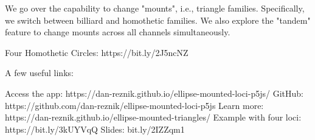 We go over the capability to change "mounts", i.e., triangle families. Specifically, we switch between billiard and homothetic families. We also explore the "tandem" feature to change mounts across all channels simultaneously.

Four Homothetic Circles: https://bit.ly/2J5ncNZ

A few useful links:

Access the app: https://dan-reznik.github.io/ellipse-mounted-loci-p5js/
GitHub: https://github.com/dan-reznik/ellipse-mounted-loci-p5js
Learn more: https://dan-reznik.github.io/ellipse-mounted-triangles/
Example with four loci: https://bit.ly/3kUYVqQ
Slides: bit.ly/2IZZqm1